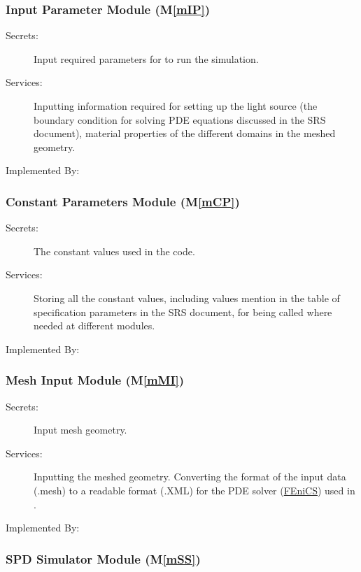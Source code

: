 \documentclass[12pt, titlepage]{article}
\newcommand{\mref}[1]{M\ref{#1}}
\begin{document}
\subsubsection{Input Parameter Module (\mref{mIP})}

\begin{description}
	\item[Secrets:]Input required parameters for \progname{} to run the simulation.
	\item[Services:]Inputting information required for setting up the light source (the boundary condition for solving PDE equations discussed in the SRS document), material properties of the different domains in the meshed geometry. 
	\item[Implemented By:] \progname{}
\end{description}


\subsubsection{Constant Parameters Module (\mref{mCP})}

\begin{description}
	\item[Secrets:] The constant values used in the code. 
	\item[Services:] Storing all the constant values, including values mention in the table of specification parameters in the SRS document, for being called where needed at different modules.
	\item[Implemented By:] \progname{}
\end{description}

\subsubsection{Mesh Input Module (\mref{mMI})}

\begin{description}
	\item[Secrets:]Input mesh geometry.
	\item[Services:]Inputting the meshed geometry. Converting the format of the input data (.mesh) to a readable format (.XML) for the PDE solver (\hyperref{https://fenicsproject.org/}{}{}{FEniCS}) used in \progname{}.  
	\item[Implemented By:] \progname{}
\end{description}

\subsubsection{SPD Simulator Module (\mref{mSS})}
\end{document}
